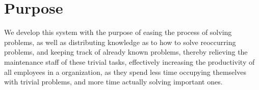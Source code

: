 \section{Purpose}
We develop this system with the purpose of easing the process of solving problems, as well as distributing knowledge as to how to solve reoccurring problems, and keeping track of already known problems, thereby relieving the maintenance staff of these trivial tasks, effectively increasing the productivity of all employees in a organization, as they spend less time occupying themselves with trivial problems, and more time actually solving important ones.

